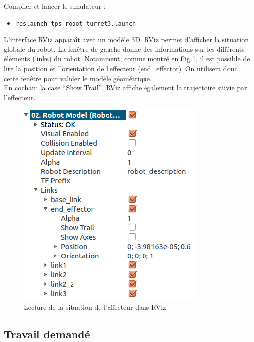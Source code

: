 \documentclass[12pt,a4paper]{article}
\begin{document}
Compiler et lancer le simulateur : 
 \begin{itemize}
 \item \texttt{roslaunch tps\_robot turret3.launch}
 \end{itemize}
 L'interface RViz apparaît avec un modèle 3D.
RViz permet d'afficher la situation globale du robot. La fenêtre de gauche donne des informations sur les différents éléments (links) du robot.
Notamment, comme montré en Fig.\ref{fig:rviz}, il est possible de lire la position et l'orientation de l'effecteur (end\_effector). 
On utilisera donc cette fenêtre pour valider le modèle géométrique.\\
En cochant la case ``Show Trail'', RViz affiche également la trajectoire suivie par l'effecteur.

\begin{figure}[h]\centering
 \includegraphics[width=.3\linewidth]{rviz}
 \caption{Lecture de la situation de l'effecteur dans RViz}
 \label{fig:rviz}
\end{figure} 
 
 \subsection{Travail demandé}
 \label{travail2s}
\end{document}
